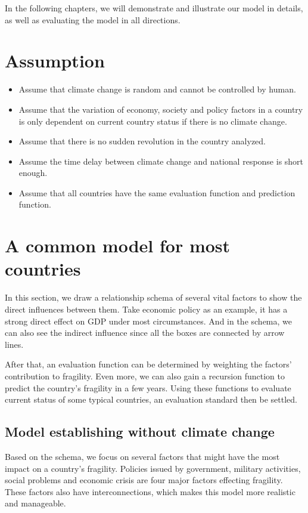 \documentclass{mcmthesis}
\begin{document}
In the following chapters, we will demonstrate and illustrate our model in details, as well as evaluating the model in all directions.

\section{Assumption}

\begin{itemize}
\item Assume that climate change is random and cannot be controlled by human.

\item Assume that the variation of economy, society and policy factors in a country is only dependent on current country status if there is no climate change.

\item Assume that there is no sudden revolution in the country analyzed.

\item Assume the time delay between climate change and national response is short enough.

\item Assume that all countries have the same evaluation function and prediction function.

\end{itemize}

\section{A common model for most countries}
In this section, we draw a relationship schema of several vital factors to show the direct influences between them. Take economic policy as an example, it has a strong direct effect on GDP under most circumstances. And in the schema, we can also see the indirect influence since all the boxes are connected by arrow lines.

 After that, an evaluation function can be determined by weighting the factors’ contribution to fragility. Even more, we can also gain a recursion function to predict the country's fragility in a few years. Using these functions to evaluate current status of some typical countries, an evaluation standard then be settled.

\subsection{Model establishing without climate change}
Based on the schema, we focus on several factors that might have the most impact on a country's fragility. Policies issued by government, military activities, social problems and economic crisis are four major factors effecting fragility. These factors also have interconnections, which makes this model more realistic and manageable.
\end{document}
